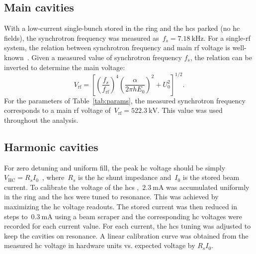 \documentclass[a4paper,
               ]{jacow}
\begin{document}
\subsection{Main cavities}
With a low-current single-bunch stored in the ring and the \glspl{hc} parked (no \gls{hc} fields), the synchrotron frequency was measured as~$f_s = \SI{7.18}{\kilo\hertz}$. For a single-rf system, the relation between synchrotron frequency and main rf voltage is well-known~\cite{Sands}. Given a measured value of synchrotron frequency $f_s$, the relation can be inverted to determine the main voltage:
\begin{equation}
    V_\mathrm{rf} = \left[\left(\frac{f_s}{f_\mathrm{rf}}\right)^4 \left(\frac{\alpha}{2\pi h E_0}\right)^2 + U_0^2\right]^{1/2}.
\end{equation}
For the parameters of Table~\ref{tab:params}, the measured synchrotron frequency corresponds to a main rf voltage of~$V_\text{rf} = \SI{522.3}{\kilo\volt}$. This value was used throughout the analysis.

\subsection{Harmonic cavities}
For zero detuning and uniform fill, the peak \gls{hc} voltage should be simply~$V_{\mathrm{HC}} = R_s I_0$~\cite{Byrd2001}, where~$R_s$ is the \gls{hc} shunt impedance and~$I_0$ is the stored beam current.
To calibrate the voltage of the \glspl{hc} ,~$\SI{2.3}{\milli\ampere}$ was accumulated uniformly in the ring and the \glspl{hc} were tuned to resonance. This was achieved by maximizing the \gls{hc} voltage readouts. The stored current was then reduced in steps to~$\SI{0.3}{\milli\ampere}$ using a beam scraper and the corresponding \gls{hc} voltages were recorded for each current value. For each current, the \glspl{hc} tuning was adjusted to keep the cavities on resonance.
A linear calibration curve was obtained from the measured \gls{hc} voltage in hardware units vs. expected voltage by $R_s I_0$.
\end{document}

